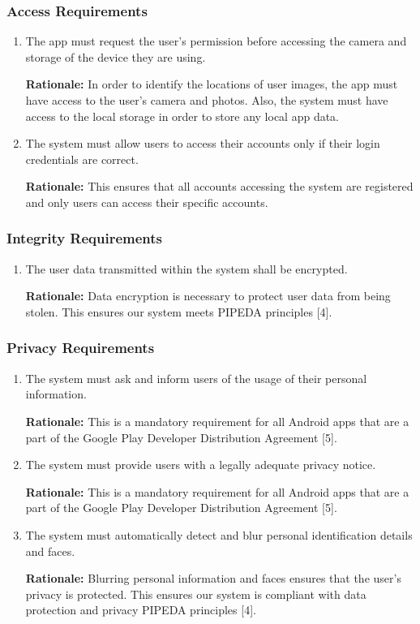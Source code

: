 \documentclass[]{article}
\begin{document}
\subsubsection{Access Requirements}
\label{ssub:access_requirements}
\begin{enumerate}[{SR-AC}1. ]
	\item The app must request the user's permission before accessing the camera and storage of the device they are using. 

    {\bf Rationale:} In order to identify the locations of user images, the app must have access to the user’s camera and photos. Also, the system must have access to the local storage in order to store any local app data.
    \item The system must allow users to access their accounts only if their login credentials are correct. 

    {\bf Rationale:} This ensures that all accounts accessing the system are registered and only users can access their specific accounts.
\end{enumerate}

\subsubsection{Integrity Requirements}
\label{ssub:integrity_requirements}
\begin{enumerate}[{SR-INT}1. ]
	\item The user data transmitted within the system shall be encrypted. 

    {\bf Rationale:} Data encryption is necessary to protect user data from being stolen. This ensures our system meets PIPEDA principles [4].
\end{enumerate}

\subsubsection{Privacy Requirements}
\label{ssub:privacy_requirements}
\begin{enumerate}[{SR-P}1. ]
	\item The system must ask and inform users of the usage of their personal information. 

    {\bf Rationale:} This is a mandatory requirement for all Android apps that are a part of the Google Play Developer Distribution Agreement [5].
    \item The system must provide users with a legally adequate privacy notice. 

    {\bf Rationale:} This is a mandatory requirement for all Android apps that are a part of the Google Play Developer Distribution Agreement [5].
    \item The system must automatically detect and blur personal identification details and faces. 

    {\bf Rationale:} Blurring personal information and faces ensures that the user’s privacy is protected. This ensures our system is compliant with data protection and privacy PIPEDA principles [4].
\end{enumerate}
\end{document}
